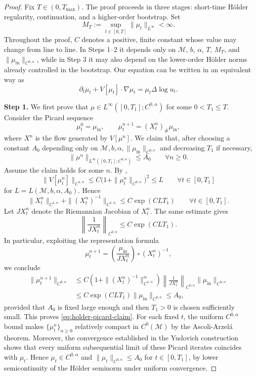 \documentclass[10pt,a4paper]{amsart}
\def\M{\mathcal M}
\begin{document}
\begin{proof}
Fix \(T\in(0,T_{\max})\).  The proof proceeds in three stages: short-time Hölder regularity,
continuation, and a higher-order bootstrap.  
Set
\[
M_T:=\sup_{t\in[0,T]}\|\mu_t\|_{L^\infty}<\infty .
\]
Throughout the proof, \(C\) denotes a positive, finite constant whose value may
change from line to line.  In Steps 1--2 it depends only on
 \(\M\), \(b\), \(\alpha\), \(T\), \(M_T\), and
\(\|\mu_{\mathrm{in}}\|_{C^{0,\alpha}}\), while in Step 3 it may also depend on the
lower-order Hölder norms already controlled in the bootstrap.
Our equation can be written in an equivalent way as
\[
\partial_t\mu_t+V[\mu_t]\cdot\nabla\mu_t=\mu_t\Delta\log u_t.
\]

\smallskip
\noindent\textbf{Step 1.}
We first prove that \(\mu\in L^\infty([0,T_1];C^{0,\alpha})\) for some
\(0<T_1\le T\).  Consider the Picard sequence
\[
\mu^0_t=\mu_{\mathrm{in}},\qquad
\mu^{n+1}_t=(X^n_t)_\#\mu_{\mathrm{in}},
\]
where \(X^n\) is the flow generated by \(V[\mu^n]\).  We claim that, after
choosing a constant \(A_0\) depending only on
\( \M,b,\alpha,\|\mu_{\mathrm{in}}\|_{C^{0,\alpha}}\) and decreasing \(T_1\) if necessary,
\begin{equation}\label{eq:holder-picard-claim}
\|\mu^n\|_{L^\infty([0,T_1];C^{0,\alpha})}
\le A_0
\qquad\forall n\ge0 .
\end{equation}
Assume the claim holds for some \(n\).  By
,
\[
\|V[\mu^n_t]\|_{C^{1,\alpha}}
\le
C\bigl(1+\|\mu^n_t\|_{C^{0,\alpha}}\bigr)^2
\le L
\qquad\forall t\in[0,T_1]
\]
for \(L=L( \M,b,\alpha,A_0)\).  Hence
\[
\|X^n_t\|_{C^{1,\alpha}}+\|(X^n_t)^{-1}\|_{C^{1,\alpha}}
\le C\exp(CLT_1)
\qquad\forall t\in[0,T_1].
\]
 Let \(JX_t^n\) denote the Riemannian Jacobian of \(X_t^n\).
The same estimate gives
\[
\left\|\frac1{ JX_t^n}\right\|_{C^{0,\alpha}}
\le C\exp(CLT_1).
\]
In particular, exploiting the representation formula
\[
\mu^{n+1}_t
=
\left(\frac{\mu_{\mathrm{in}}}{ JX_t^n}\right)\circ (X_t^n)^{-1},
\]
we conclude
\[
\begin{aligned}
\|\mu^{n+1}_t\|_{C^{0,\alpha}}
&\le
C\left(1+\|(X_t^n)^{-1}\|_{C^{1,\alpha}}^\alpha\right)
\left\|\frac1{ JX_t^n}\right\|_{C^{0,\alpha}}
\|\mu_{\mathrm{in}}\|_{C^{0,\alpha}}  \\
&\le
C\exp(CLT_1)\|\mu_{\mathrm{in}}\|_{C^{0,\alpha}}
\le A_0,
\end{aligned}
\]
provided that \(A_0\) is fixed large enough and then \(T_1>0\) is chosen
sufficiently small.  This proves
\eqref{eq:holder-picard-claim}.  
For each fixed \(t\), the uniform \(C^{0,\alpha}\) bound makes
\(\{\mu_t^n\}_{n\ge0}\) relatively compact in \(C^0(\M)\) by the
Ascoli-Arzel\'a theorem. Moreover, the convergence established in the
Yudovich construction shows that every uniform subsequential limit of these
Picard iterates coincides with \(\mu_t\).
Hence
\(\mu_t\in C^{0,\alpha}\) and
\(\|\mu_t\|_{C^{0,\alpha}}\le A_0\) for \(t\in[0,T_1]\), by lower
semicontinuity of the Hölder seminorm under uniform convergence.


\end{proof}
\end{document}
